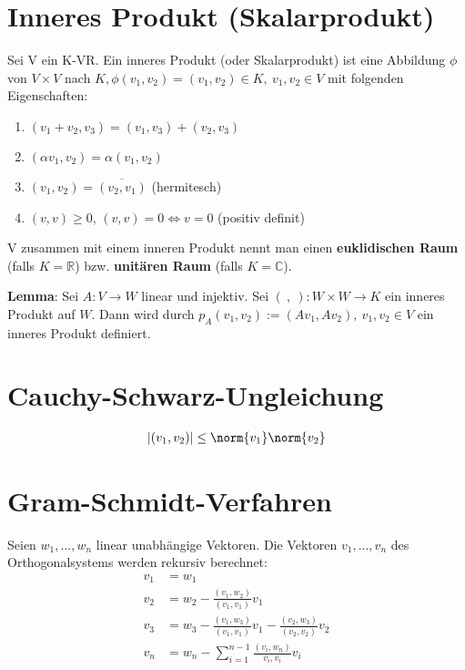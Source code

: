 \section{Inneres Produkt (Skalarprodukt)}
\begin{definition}
Sei V ein K-VR. Ein inneres Produkt (oder Skalarprodukt) ist eine Abbildung $\phi$ von $V \times V$ nach $K, \phi (v_1,v_2) = (v_1,v_2) \in K,~v_1,v_2 \in V$ mit folgenden Eigenschaften:
\begin{enumerate}
	\item $(v_1+v_2,v_3) = (v_1,v_3)+(v_2,v_3)$
	\item $(\alpha v_1,v_2) = \alpha (v_1,v_2)$
	\item $(v_1,v_2) = \overline{(v_2,v_1)}$ (hermitesch)
	\item $(v,v) \geq 0$, $(v,v) = 0 \Leftrightarrow v=0$ (positiv definit)
\end{enumerate}
\end{definition}
\begin{remark}
V zusammen mit einem inneren Produkt nennt man einen \textbf{euklidischen Raum} (falls $K=\mathbb{R}$) bzw. \textbf{unitären Raum} (falls $K=\mathbb{C}$).
\end{remark}
\textbf{Lemma}:
Sei $A:V \rightarrow W$ linear und injektiv. Sei $(~,~):W \times W \rightarrow K$ ein inneres Produkt auf $W$. Dann wird durch $p_A(v_1,v_2):=(Av_1,Av_2),~v_1,v_2 \in V$ ein inneres Produkt definiert.

\section{Cauchy-Schwarz-Ungleichung}
\begin{theorem}
\begin{align*}
|(v_1,v_2)| \leq \norm{v_1} \norm{v_2}
\end{align*}
\end{theorem}

\section{Gram-Schmidt-Verfahren}
\begin{theorem}
Seien $w_1,...,w_n$ linear unabhängige Vektoren. Die Vektoren $v_1,...,v_n$ des Orthogonalsystems werden rekursiv berechnet:
\begin{align*}
v_1 &= w_1\\
v_2 &= w_2 - \frac{(v_1,w_2)}{(v_1,v_1)}v_1\\
v_3 &= w_3 - \frac{(v_1,w_3)}{(v_1,v_1)}v_1 - \frac{(v_2,w_3)}{(v_2,v_2)}v_2\\
v_n &= w_n - \sum_{i=1}^{n-1}\frac{(v_i,w_n)}{v_i,v_i}v_i
\end{align*}
\end{theorem}

